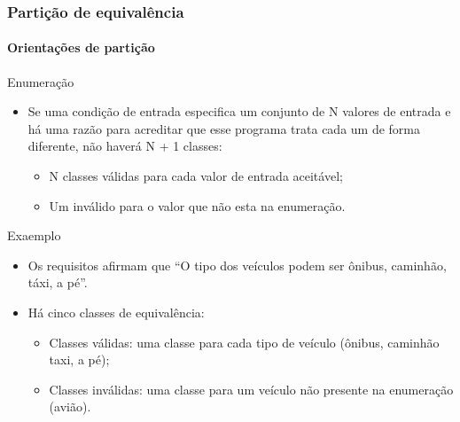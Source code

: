 \begin{frame}
\frametitle{Partição de equivalência}
\framesubtitle{Orientações de partição}

\begin{block:fact}{Enumeração}
\begin{itemize}
	\item Se uma condição de entrada especifica um conjunto de N valores de entrada e há
	uma razão para acreditar que esse programa trata cada um de forma diferente, não
	haverá N + 1 classes:
	\begin{itemize}
		\item N classes válidas para cada valor de entrada aceitável;
		\item Um inválido para o valor que não esta na enumeração.
	\end{itemize}
\end{itemize}
\end{block:fact}

\begin{block}{Exaemplo}
\begin{itemize}
	\item Os requisitos afirmam que ``O tipo dos veículos podem ser ônibus, 
	caminhão, táxi, a pé''.

	\item Há cinco classes de equivalência:
	\begin{itemize}
		\item Classes válidas: uma classe para cada tipo de veículo (ônibus, caminhão
		taxi, a pé);
		\item Classes inválidas: uma classe para um veículo não presente na
		enumeração (avião).
	\end{itemize}
\end{itemize}
\end{block}
\end{frame}



